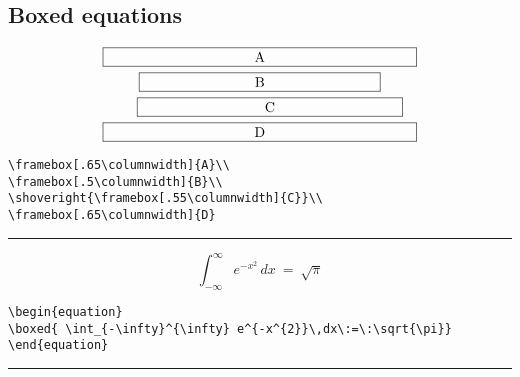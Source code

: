 \subsection{Boxed equations}
\begin{multline}
\framebox[.65\columnwidth]{A}\\
\framebox[.5\columnwidth]{B}\\
\shoveright{\framebox[.55\columnwidth]{C}}\\
\framebox[.65\columnwidth]{D}
\end{multline}
%
\begin{verbatim}
\framebox[.65\columnwidth]{A}\\
\framebox[.5\columnwidth]{B}\\
\shoveright{\framebox[.55\columnwidth]{C}}\\
\framebox[.65\columnwidth]{D}
\end{verbatim}
%
\begin{center}{\rule{10cm}{0.5pt}}\end{center}
%
\begin{equation}
\boxed{ \int_{-\infty}^{\infty} e^{-x^{2}}\,dx\:=\:\sqrt{\pi}}
\end{equation}
%
\begin{verbatim}
\begin{equation} 
\boxed{ \int_{-\infty}^{\infty} e^{-x^{2}}\,dx\:=\:\sqrt{\pi}}
\end{equation}
\end{verbatim}
%
\begin{center}{\rule{10cm}{0.5pt}}\end{center}
%
%
